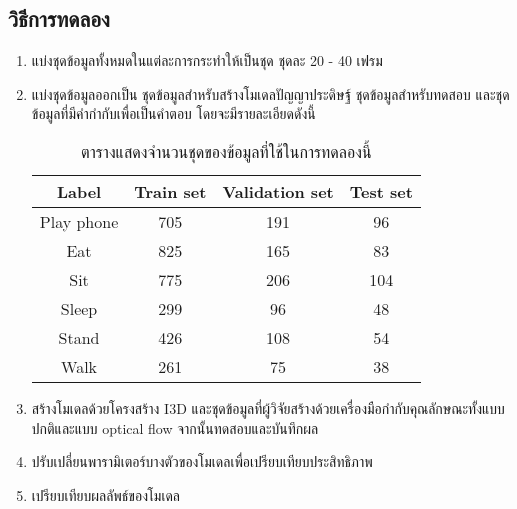 \subsection*{วิธีการทดลอง}
	\begin{enumerate}
		\setlength\itemsep{-0.25em}
		\item แบ่งชุดข้อมูลทั้งหมดในแต่ละการกระทำให้เป็นชุด ชุดละ 20 - 40 เฟรม 
        \item แบ่งชุดข้อมูลออกเป็น ชุดข้อมูลสำหรับสร้างโมเดลปัญญาประดิษฐ์ ชุดข้อมูลสำหรับทดสอบ และชุดข้อมูลที่มีคำกำกับเพื่อเป็นคำตอบ โดยจะมีรายละเอียดดังนี้
            \begin{table}[!ht]
                \centering
                \begin{tabular}{|c|c|c|c|}
                    \hline
                    Label & Train set & Validation set & Test set\\
                    \hline
                    Play phone & 705 & 191 & 96\\
                    Eat & 825 & 165 & 83\\
                    Sit & 775 & 206 & 104\\
                    Sleep & 299 & 96 & 48\\
                    Stand & 426 & 108 & 54\\
                    Walk & 261 & 75 & 38\\
                    \hline
                \end{tabular}
                \caption{ตารางแสดงจำนวนชุดของข้อมูลที่ใช้ในการทดลองนี้}
                \label{tab: I3D_datasetInfo}
            \end{table}
        \item สร้างโมเดลด้วยโครงสร้าง I3D และชุดข้อมูลที่ผู้วิจัยสร้างด้วยเครื่องมือกำกับคุณลักษณะทั้งแบบปกติและแบบ optical flow จากนั้นทดสอบและบันทึกผล 
		\item ปรับเปลี่ยนพารามิเตอร์บางตัวของโมเดลเพื่อเปรียบเทียบประสิทธิภาพ
		\item เปรียบเทียบผลลัพธ์ของโมเดล
\end{enumerate}
\clearpage
